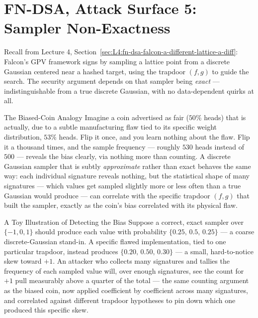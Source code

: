\section{FN-DSA, Attack Surface 5: Sampler Non-Exactness}
\label{sec:L6:sampler-non-exactness}

Recall from Lecture 4, Section~\ref{sec:L4:fn-dsa-falcon-a-different-lattice-a-diff}: Falcon's GPV framework signs by sampling a lattice point from a discrete Gaussian centered near a hashed target, using the trapdoor $(f,g)$ to guide the search. The security argument depends on that sampler being \emph{exact} --- indistinguishable from a true discrete Gaussian, with no data-dependent quirks at all.

\begin{rmkbox}{The Biased-Coin Analogy}
Imagine a coin advertised as fair ($50\%$ heads) that is actually, due to a subtle manufacturing flaw tied to its specific weight distribution, $53\%$ heads. Flip it once, and you learn nothing about the flaw. Flip it a thousand times, and the sample frequency --- roughly $530$ heads instead of $500$ --- reveals the bias clearly, via nothing more than counting. A discrete Gaussian sampler that is subtly \emph{approximate} rather than exact behaves the same way: each individual signature reveals nothing, but the statistical shape of many signatures --- which values get sampled slightly more or less often than a true Gaussian would produce --- can correlate with the specific trapdoor $(f,g)$ that built the sampler, exactly as the coin's bias correlated with its physical flaw.
\end{rmkbox}

\begin{exbox}{A Toy Illustration of Detecting the Bias}
Suppose a correct, exact sampler over $\{-1,0,1\}$ should produce each value with probability $\{0.25,\,0.5,\,0.25\}$ --- a coarse discrete-Gaussian stand-in. A specific flawed implementation, tied to one particular trapdoor, instead produces $\{0.20,\,0.50,\,0.30\}$ --- a small, hard-to-notice skew toward $+1$. An attacker who collects many signatures and tallies the frequency of each sampled value will, over enough signatures, see the count for $+1$ pull measurably above a quarter of the total --- the same counting argument as the biased coin, now applied coefficient by coefficient across many signatures, and correlated against different trapdoor hypotheses to pin down which one produced this specific skew.
\end{exbox}

